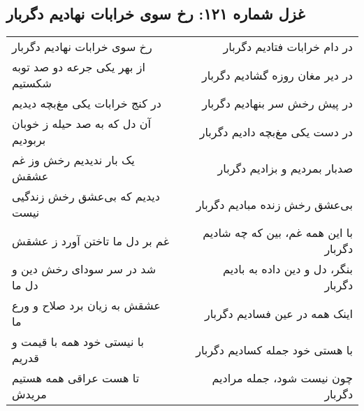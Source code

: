 \begin{center}
\section*{غزل شماره ۱۲۱: رخ سوی خرابات نهادیم دگربار}
\label{sec:121}
\begin{longtable}{l p{0.5cm} r}
رخ سوی خرابات نهادیم دگربار
&&
در دام خرابات فتادیم دگربار
\\
از بهر یکی جرعه دو صد توبه شکستیم
&&
در دیر مغان روزه گشادیم دگربار
\\
در کنج خرابات یکی مغ‌بچه دیدیم
&&
در پیش رخش سر بنهادیم دگربار
\\
آن دل که به صد حیله ز خوبان بربودیم
&&
در دست یکی مغ‌بچه دادیم دگربار
\\
یک بار ندیدیم رخش وز غم عشقش
&&
صدبار بمردیم و بزادیم دگربار
\\
دیدیم که بی‌عشق رخش زندگیی نیست
&&
بی‌عشق رخش زنده مبادیم دگربار
\\
غم بر دل ما تاختن آورد ز عشقش
&&
با این همه غم، بین که چه شادیم دگربار
\\
شد در سر سودای رخش دین و دل ما
&&
بنگر، دل و دین داده به بادیم دگربار
\\
عشقش به زیان برد صلاح و ورع ما
&&
اینک همه در عین فسادیم دگربار
\\
با نیستی خود همه با قیمت و قدریم
&&
با هستی خود جمله کسادیم دگربار
\\
تا هست عراقی همه هستیم مریدش
&&
چون نیست شود، جمله مرادیم دگربار
\\
\end{longtable}
\end{center}
